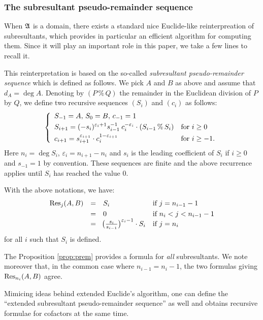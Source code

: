 \documentclass{article}
\begin{document}
\subsubsection*{The subresultant pseudo-remainder sequence}

When $\mathfrak A$ is a domain, there exists a standard nice Euclide-like
reinterpreation of subresultants, which provides in particular an 
efficient algorithm for computing them. Since it will play an important 
role in this paper, we take a few lines to recall it.

This reinterpretation is based on the so-called \emph{subresultant 
pseudo-remainder sequence} which is defined as follows. We pick $A$ and 
$B$ as above and assume that $d_A = \deg A$. Denoting by $(P \,\%\, Q)$ 
the remainder in the Euclidean division of $P$ by $Q$, we define two 
recursive sequences $(S_i)$ and $(c_i)$ as follows:
$$\left\{\begin{array}{ll}
S_{-1} = A, \, S_0 = B, \, c_{-1} = 1 \smallskip \\
\displaystyle S_{i+1} = (-s_i)^{\varepsilon_i + 1}
s_{i-1}^{-1} \: c_i^{-\varepsilon_i} \cdot (S_{i-1} \,\%\, S_i)
& \text{for } i \geq 0 \smallskip \\
\displaystyle c_{i+1} = s_{i+1}^{\varepsilon_{i+1}} \cdot c_i^{1-\varepsilon_{i+1}}
& \text{for } i \geq -1. 
\end{array}\right.$$
Here $n_i = \deg S_i$, $\varepsilon_i = n_{i+1} - n_i$ and $s_i$ is the 
leading coefficient of $S_i$ if $i \geq 0$ and $s_{-1} = 1$ by 
convention. These sequences are finite and the above recurrence applies 
until $S_i$ has reached the value $0$.

\begin{prop}
\label{prop:prem}
With the above notations, we have:
$$\begin{array}{rcll}
\Res_j(A,B) & = & S_i & \text{if } j = n_{i-1} - 1 \smallskip \\
& = & 0 & \text{if } n_i < j < n_{i-1} - 1 \\
& = & \!\big(\frac{s_i}{s_{i-1}}\big)^{\varepsilon_i-1} \cdot S_i & 
\text{if } j = n_i
\end{array}$$
for all $i$ such that $S_i$ is defined.
\end{prop}

\begin{rem}
The Proposition \ref{prop:prem} provides a formula for \emph{all} 
subresultants. We note moreover that, in the common case where $n_{i-1} 
= n_i - 1$, the two formulas giving $\text{\rm Res}_{n_i}(A,B)$ agree.

Mimicing ideas behind extended Euclide's algorithm, one can define the 
``extended subresultant pseudo-remainder sequence'' as well and obtains
recursive formulae for cofactors at the same time.
\end{rem}
\end{document}

